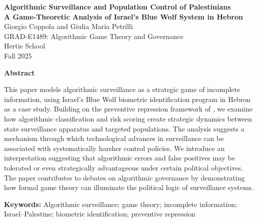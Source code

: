 \documentclass[11pt,a4paper]{article}
\theoremstyle{definition}
\theoremstyle{remark}
\theoremstyle{definition}
\begin{document}
\begin{titlepage}
    \thispagestyle{empty}
    
    \vspace*{2cm}
    \begin{center}
    
    {\Large\bfseries Algorithmic Surveillance and Population Control of Palestinians}\\[0.35cm]
    {\large\bfseries A Game-Theoretic Analysis of Israel's Blue Wolf System in Hebron}\\[1.2cm]
    
    {\normalsize Giorgio Coppola and Giulia Maria Petrilli}\\[0.6cm]
    
    {\small
    GRAD-E1489: Algorithmic Game Theory and Governance\\
    Hertie School\\
    Fall 2025
    }
    
    \end{center}
    \vspace*{2cm}
    
    \begin{minipage}{0.9\textwidth}
    \small
    \begin{center}
    \textbf{Abstract}
    \end{center}
    \noindent
    This paper models algorithmic surveillance as a strategic game of incomplete information,
    using Israel's Blue Wolf biometric identification program in Hebron as a case study. Building on the preventive 
    repression framework of \citet{dragu2021digital}, we examine how algorithmic classification and risk scoring create
    strategic dynamics between state surveillance apparatus and targeted populations. The analysis suggests a mechanism through which
    technological advances in surveillance can be associated with systematically harsher control policies. 
    We introduce an interpretation suggesting that algorithmic errors and false positives may be tolerated or even strategically 
    advantageous under certain political objectives. The paper contributes to debates on algorithmic governance by demonstrating 
    how formal game theory can illuminate the political logic of surveillance systems.

    \vspace{1cm}
    \noindent\textbf{Keywords:} Algorithmic surveillance; game theory; incomplete information; Israel--Palestine; biometric identification; 
    preventive repression
    \end{minipage}
    
    \vspace*{1.5cm}
    \end{titlepage}    
\end{document}
